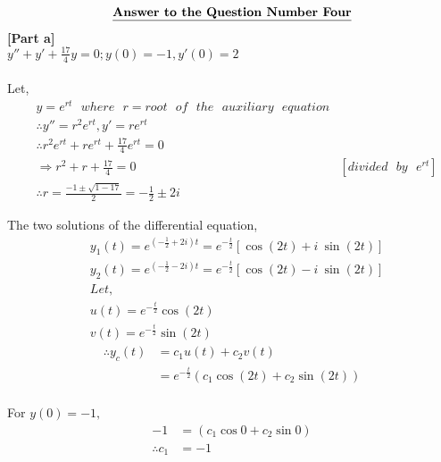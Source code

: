 \documentclass{article}
\newcommand\tab[1][1cm]{\hspace*{#1}}
\begin{document}
\begin{homeworkProblem}
    \[      \textbf{\underline{Answer to the Question Number Four}}
    \]
    \textbf{[Part a]}
    \\
     \tab$y''+y'+\frac{17}{4}y=0;y(0)=-1,y'(0)=2$\\
    \vspace{5mm}\\
Let,
\begin{align*}
    &y=e^{rt}\:\:\:where\:\:\:r=root\:\:\:of\:\:\:the\:\:\:auxiliary\:\:\:equation\\
    &\therefore y''=r^2 e^{rt},y'=r e^{rt}\\
    &\therefore r^2 e^{rt}+r e^{rt}+\frac{17}{4}e^{rt}=0\\
    &\Rightarrow r^2+r+\frac{17}{4}=0 &[divided\:\:\:by\:\:\:e^{rt}]\\
    &\therefore r=\frac{-1\pm \sqrt{1-17}}{2}=-\frac{1}{2}\pm2i
\end{align*}

The two solutions of the differential equation,
\begin{align*}
    &y_1(t)=e^{(-\frac{1}{2}+2i)t}=e^{-\frac{t}{2}}[\cos (2t)+i\:\sin (2t)]\\
    &y_2(t)=e^{(-\frac{1}{2}-2i)t}=e^{-\frac{t}{2}}[\cos (2t)-i\:\sin (2t)]\\
    &Let,\\
    &u(t)=e^{-\frac{t}{2}}\cos (2t)\\
    &v(t)=e^{-\frac{t}{2}}\sin (2t)
\end{align*}
\begin{align*}
    \therefore y_c(t)&=c_1u(t)+c_2v(t)\\
    &=e^{-\frac{t}{2}}(c_1\cos (2t)+c_2\sin (2t))\\
\end{align*}

For $y(0)=-1,$
\begin{align*}
    -1&=(c_1\cos 0+c_2\sin 0)\\
    \therefore c_1&=-1
\end{align*}


\end{homeworkProblem}
\end{document}
